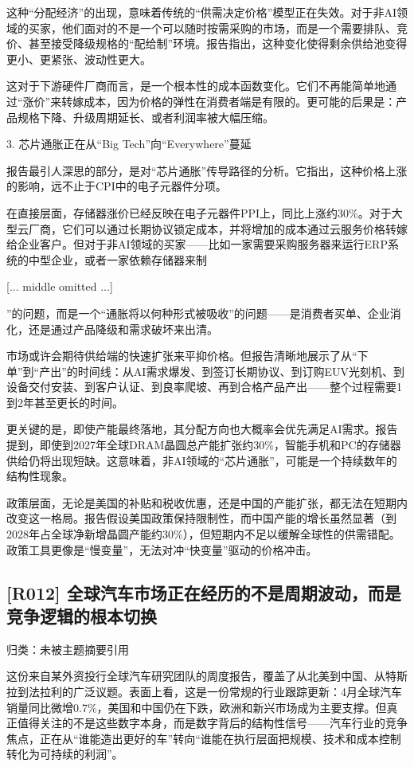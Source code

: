 \documentclass[11pt]{ctexart}
\begin{document}
这种“分配经济”的出现，意味着传统的“供需决定价格”模型正在失效。对于非AI领域的买家，他们面对的不是一个可以随时按需采购的市场，而是一个需要排队、竞价、甚至接受降级规格的“配给制”环境。报告指出，这种变化使得剩余供给池变得更小、更紧张、波动性更大。

这对于下游硬件厂商而言，是一个根本性的成本函数变化。它们不再能简单地通过“涨价”来转嫁成本，因为价格的弹性在消费者端是有限的。更可能的后果是：产品规格下降、升级周期延长、或者利润率被大幅压缩。

3. 芯片通胀正在从“Big Tech”向“Everywhere”蔓延

报告最引人深思的部分，是对“芯片通胀”传导路径的分析。它指出，这种价格上涨的影响，远不止于CPI中的电子元器件分项。

在直接层面，存储器涨价已经反映在电子元器件PPI上，同比上涨约30\%。对于大型云厂商，它们可以通过长期协议锁定成本，并将增加的成本通过云服务价格转嫁给企业客户。但对于非AI领域的买家——比如一家需要采购服务器来运行ERP系统的中型企业，或者一家依赖存储器来制

[... middle omitted ...]

”的问题，而是一个“通胀将以何种形式被吸收”的问题——是消费者买单、企业消化，还是通过产品降级和需求破坏来出清。

市场或许会期待供给端的快速扩张来平抑价格。但报告清晰地展示了从“下单”到“产出”的时间线：从AI需求爆发、到签订长期协议、到订购EUV光刻机、到设备交付安装、到客户认证、到良率爬坡、再到合格产品产出——整个过程需要1到2年甚至更长的时间。

更关键的是，即使产能最终落地，其分配方向也大概率会优先满足AI需求。报告提到，即使到2027年全球DRAM晶圆总产能扩张约30\%，智能手机和PC的存储器供给仍将出现短缺。这意味着，非AI领域的“芯片通胀”，可能是一个持续数年的结构性现象。

政策层面，无论是美国的补贴和税收优惠，还是中国的产能扩张，都无法在短期内改变这一格局。报告假设美国政策保持限制性，而中国产能的增长虽然显著（到2028年占全球净新增晶圆产能约30\%），但短期内不足以缓解全球性的供需错配。政策工具更像是“慢变量”，无法对冲“快变量”驱动的价格冲击。

\subsection{[R012] 全球汽车市场正在经历的不是周期波动，而是竞争逻辑的根本切换}
{\small\color{refgray}归类：未被主题摘要引用}

这份来自某外资投行全球汽车研究团队的周度报告，覆盖了从北美到中国、从特斯拉到法拉利的广泛议题。表面上看，这是一份常规的行业跟踪更新：4月全球汽车销量同比微增0.7\%，美国和中国仍在下跌，欧洲和新兴市场成为主要支撑。但真正值得关注的不是这些数字本身，而是数字背后的结构性信号——汽车行业的竞争焦点，正在从“谁能造出更好的车”转向“谁能在执行层面把规模、技术和成本控制转化为可持续的利润”。
\end{document}
